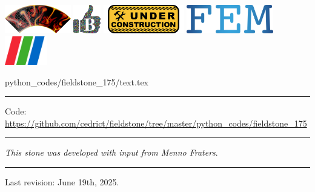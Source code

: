 \noindent
\includegraphics[height=1.25cm]{images/pictograms/aspect_logo}
\includegraphics[height=1.25cm]{images/pictograms/benchmark}
\includegraphics[height=1.25cm]{images/pictograms/under_construction}
\includegraphics[height=1.25cm]{images/pictograms/FEM}
\includegraphics[height=1.25cm]{images/pictograms/paraview}


\begin{flushright} {\tiny {\color{gray} python\_codes/fieldstone\_175/text.tex}} \end{flushright}

%

\par\noindent\rule{\textwidth}{0.4pt}

\begin{center}
\inpython
{\small Code: \url{https://github.com/cedrict/fieldstone/tree/master/python_codes/fieldstone_175}}
\end{center}

\par\noindent\rule{\textwidth}{0.4pt}

{\sl This stone was developed with input from Menno Fraters}. 

\par\noindent\rule{\textwidth}{0.4pt}

Last revision: June 19th, 2025.

